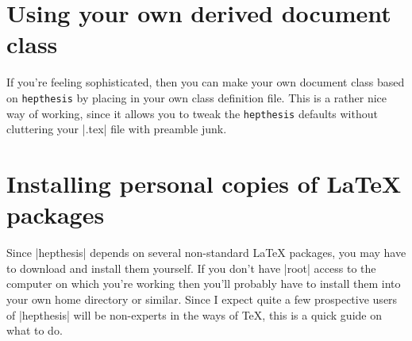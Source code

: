 \documentclass[12pt]{article}
\newcommand{\hepthesis}{\texttt{hepthesis}\xspace}
\newenvironment{snippet}{\Verbatim}{\endVerbatim}
\begin{document}
\appendix

\section{Using your own derived document class}
\label{app:DerivedClass}
If you're feeling sophisticated, then you can make your own document class based on
\hepthesis by placing
%
\begin{snippet}
\end{snippet}
%
in your own class definition file. This is a rather nice way of working, since
it allows you to tweak the \hepthesis defaults without cluttering your
|.tex| file with preamble junk.


\section{Installing personal copies of \LaTeX{} packages}
\label{app:InstallingPackages}
Since |hepthesis| depends on several non-standard \LaTeX{} packages, you may have to
download and install them yourself. If you don't have |root| access to the computer
on which you're working then you'll probably have to install them into your own home
directory or similar. Since I expect quite a few prospective users of |hepthesis| will
be non-experts in the ways of \TeX{}, this is a quick guide on what to do.
\end{document}
